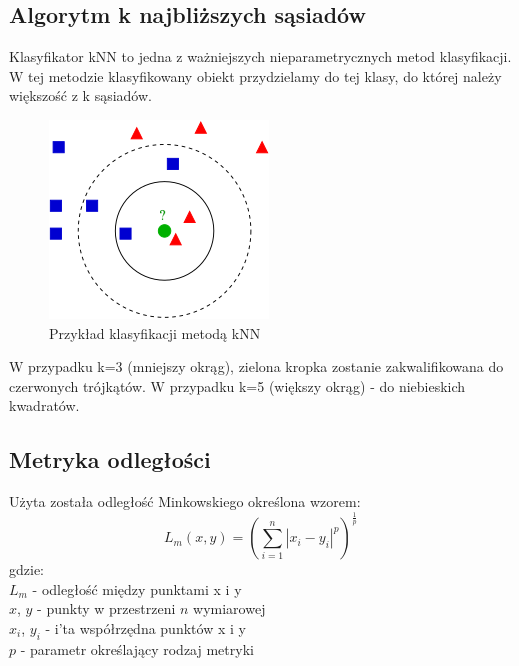 \documentclass[12pt,a4paper]{article}
\begin{document}
\subsection{Algorytm k najbliższych sąsiadów}
Klasyfikator kNN to jedna z ważniejszych nieparametrycznych metod klasyfikacji. W tej metodzie
klasyfikowany obiekt przydzielamy do tej klasy, do której należy większość z k sąsiadów.
\begin{figure}[!h]
	\includegraphics{"KnnClassification.png"}
	\centering
	\caption{Przykład klasyfikacji metodą kNN}
\end{figure}

W przypadku k=3 (mniejszy okrąg), zielona kropka zostanie zakwalifikowana do czerwonych
trójkątów. W przypadku k=5 (większy okrąg) - do niebieskich kwadratów.


\subsection{Metryka odległości}
Użyta została odległość Minkowskiego określona wzorem:
\[
	L_m(x, y) = \left(\sum_{i = 1}^{n} |x_i - y_i|^p\right)^\frac{1}{p}
\]
gdzie: \\
\indent $L_m$ - odległość między punktami x i y\\
\indent $x$, $y$ - punkty w przestrzeni $n$ wymiarowej\\
\indent $x_i$, $y_i$ - i'ta współrzędna punktów x i y\\
\indent $p$ - parametr określający rodzaj metryki\\
\end{document}
